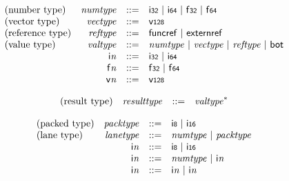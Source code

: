$$
\begin{array}{@{}lrrl@{}l@{}}
\mbox{(number type)} & {\mathit{numtype}} &::=& \mathsf{i{\scriptstyle32}} ~|~ \mathsf{i{\scriptstyle64}} ~|~ \mathsf{f{\scriptstyle32}} ~|~ \mathsf{f{\scriptstyle64}} \\
\mbox{(vector type)} & {\mathit{vectype}} &::=& \mathsf{v{\scriptstyle128}} \\
\mbox{(reference type)} & {\mathit{reftype}} &::=& \mathsf{funcref} ~|~ \mathsf{externref} \\
\mbox{(value type)} & {\mathit{valtype}} &::=& {\mathit{numtype}} ~|~ {\mathit{vectype}} ~|~ {\mathit{reftype}} ~|~ \mathsf{bot} \\
& {\mathsf{i}}{{\mathit{n}}} &::=& \mathsf{i{\scriptstyle32}} ~|~ \mathsf{i{\scriptstyle64}} \\
& {\mathsf{f}}{{\mathit{n}}} &::=& \mathsf{f{\scriptstyle32}} ~|~ \mathsf{f{\scriptstyle64}} \\
& {\mathsf{v}}{{\mathit{n}}} &::=& \mathsf{v{\scriptstyle128}} \\
\end{array}
$$

\vspace{1ex}

$$
\begin{array}{@{}lrrl@{}l@{}}
\mbox{(result type)} & {\mathit{resulttype}} &::=& {{\mathit{valtype}}^\ast} \\
\end{array}
$$

\vspace{1ex}

$$
\begin{array}{@{}lrrl@{}l@{}}
\mbox{(packed type)} & {\mathit{packtype}} &::=& \mathsf{i{\scriptstyle8}} ~|~ \mathsf{i{\scriptstyle16}} \\
\mbox{(lane type)} & {\mathit{lanetype}} &::=& {\mathit{numtype}} ~|~ {\mathit{packtype}} \\
& {\mathsf{i}}{{\mathit{n}}} &::=& \mathsf{i{\scriptstyle8}} ~|~ \mathsf{i{\scriptstyle16}} \\
& {\mathsf{i}}{{\mathit{n}}} &::=& {\mathit{numtype}} ~|~ {\mathsf{i}}{{\mathit{n}}} \\
& {\mathsf{i}}{{\mathit{n}}} &::=& {\mathsf{i}}{{\mathit{n}}} ~|~ {\mathsf{i}}{{\mathit{n}}} \\
\end{array}
$$

\vspace{1ex}


